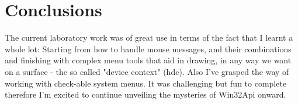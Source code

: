\section*{Conclusions}

The current laboratory work was of great use in terms of the fact that I learnt a whole lot: Starting from how to handle mouse messages, and their combinations and finishing with complex menu tools that aid in drawing, in any way we want on a surface - the so called "device context" (hdc). Also I've grasped the way of working with check-able system menus. It was challenging but fun to complete therefore I'm excited to continue unveiling the mysteries of Win32Api onward.

\clearpage